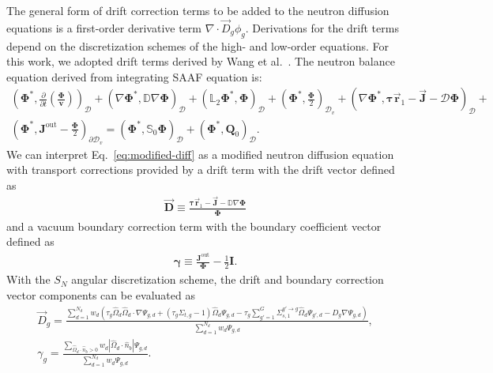 \documentclass[letterpaper]{mc2025}
\begin{document}
The general form of drift correction terms to be added to the neutron diffusion equations is a
first-order derivative term $\nabla\cdot \vec{D}_g\phi_g$.
Derivations for the drift terms depend on the discretization schemes of the high- and low-order
equations. For this work, we adopted drift terms derived by Wang et al.\
\cite{wang_diffusion_2014}. The neutron balance equation derived from
integrating \gls*{SAAF} equation is:
%
\begin{multline}
  \left(\bm{\Phi}^*,\frac{\partial}{\partial t}\left(\frac{\bm{\Phi}}{\bm{v}}\right)\right)_\mathcal{D}
  + \left(\nabla\bm{\Phi}^*, \mathbb{D}\nabla\bm{\Phi}\right)_\mathcal{D}
  + \left(\mathbb{L}_2\bm{\Phi}^*,\bm{\Phi}\right)_\mathcal{D}
  + \left(\bm{\Phi}^*,\frac{\bm{\Phi}}{2}\right)_{\mathcal{D}_v}
  + \left(\nabla\bm{\Phi}^*,\bm{\tau}\vec{\bm{r}}_1-\vec{\bm{J}}-\mathcal{D}\bm{\Phi}\right)_\mathcal{D}
  + \\
  \left(\bm{\Phi}^*,\bm{J}^\text{out}-\frac{\bm{\Phi}}{2}\right)_{\partial\mathcal{D}_v}
  = \left(\bm{\Phi}^*,\mathbb{S}_0\bm{\Phi}\right)_\mathcal{D}
  + \left(\bm{\Phi}^*,\bm{Q}_0\right)_\mathcal{D}. \label{eq:modified-diff}
\end{multline}
%
We can interpret Eq.\ \ref{eq:modified-diff} as a modified neutron diffusion equation with
transport corrections provided by a drift term with the drift vector defined as
%
\begin{gather}
  \vec{\bm{D}} \equiv \frac{\bm{\tau}\vec{\bm{r}}_1-\vec{\bm{J}}-\mathbb{D}\nabla\bm{\Phi}}{\bm{\Phi}}
\end{gather}
%
and a vacuum boundary correction term with the boundary coefficient vector defined as
%
\begin{gather}
  \bm{\gamma} \equiv \frac{\bm{J}^\text{out}}{\bm{\Phi}}-\frac{1}{2}\bm{I}.
\end{gather}
%
With the $S_N$ angular discretization scheme, the drift and boundary correction vector components
can be evaluated as
%
\begin{gather}
  \vec{D}_g = \frac{\sum^{N_d}_{d=1}w_d\left(\tau_g\hat{\Omega}_d\hat{\Omega}_d\cdot\nabla\Psi_{g,d}
  + \left(\tau_g\Sigma_{t,g}-1\right)\hat{\Omega}_d\Psi_{g,d}
  - \tau_g\sum^G_{g'=1}\Sigma^{g'\rightarrow g}_{s,1}\hat{\Omega}_d\Psi_{g',d}
  - D_g\nabla\Psi_{g,d}\right)}{\sum^{N_d}_{d=1}w_d\Psi_{g,d}}, \label{eq:drift} \\
  \gamma_g =
  \frac{\sum_{\hat{\Omega}_d\cdot\hat{n}_b > 0}w_d |\hat{\Omega}_d\cdot\hat{n}_b |
  \Psi_{g,d}}{\sum^{N_d}_{d=1}w_d\Psi_{g,d}}. \label{eq:bound-coef}
\end{gather}
\end{document}
